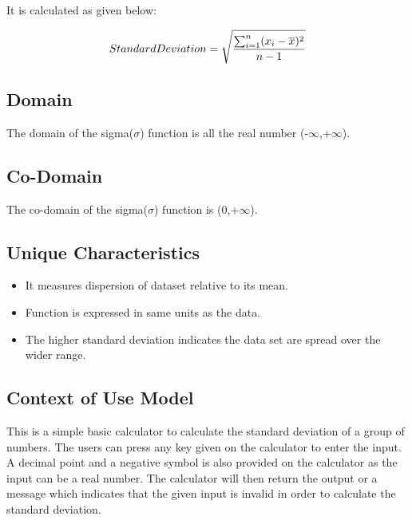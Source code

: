 \documentclass[12pt]{report}
\begin{document}
It is calculated as given below:

$$Standard Deviation = {\Large\sqrt{ \frac{\sum_{i=1}^{n}(x_i-\overline x)^2}{n-1}}}$$


\subsection{\Large \vspace{0.1 cm}Domain}
The domain of the sigma($\sigma$) function is all the real number (-$\infty$,+$\infty$).

\subsection{\Large \vspace{0.1 cm}Co-Domain}
The co-domain of the sigma($\sigma$) function is (0,$+\infty$).  
 
\subsection{\Large \vspace{0.1 cm}Unique Characteristics}
\begin{itemize}
    \item It measures dispersion of dataset relative to its mean.
    \item Function is expressed in same units as the data.
    \item The higher standard deviation indicates the data set are spread over the wider range. 
\end{itemize}

\subsection{\Large\vspace{0.4 cm}Context of Use Model}
This is a simple basic calculator to calculate the standard deviation of a group of numbers. The users can press any key given on the calculator to enter the input. A decimal point and a negative symbol is also provided on the calculator as the input can be a real number. The calculator will then return the output or a message which indicates that the given input is invalid in order to calculate the standard deviation.

\vspace{1cm}
\end{document}
